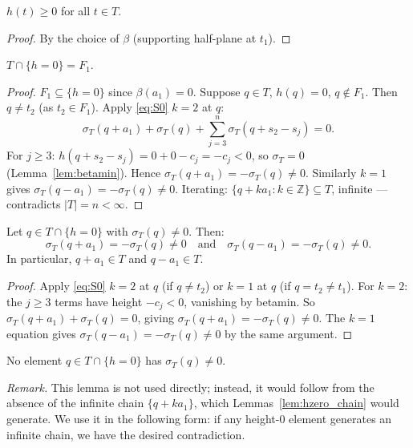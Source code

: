 \begin{lemma}[betamin]\label{lem:betamin}
$h(t) \geq 0$ for all $t \in T$.
\end{lemma}
\begin{proof}
By the choice of $\beta$ (supporting half-plane at $t_1$).
\end{proof}

\begin{lemma}[hzero]\label{lem:hzero}
$T \cap \{h = 0\} = F_1$.
\end{lemma}
\begin{proof}
$F_1 \subseteq \{h=0\}$ since $\beta(a_1)=0$.
Suppose $q \in T$, $h(q)=0$, $q \notin F_1$.  Then $q \neq t_2$ (as $t_2 \in F_1$).
Apply \eqref{eq:S0} $k=2$ at $q$:
\[
  \sigma_T(q+a_1) + \sigma_T(q) + \sum_{j=3}^n \sigma_T(q+s_2-s_j) = 0.
\]
For $j \geq 3$: $h(q+s_2-s_j) = 0 + 0 - c_j = -c_j < 0$, so $\sigma_T = 0$
(Lemma~\ref{lem:betamin}).  Hence $\sigma_T(q+a_1) = -\sigma_T(q) \neq 0$.
Similarly $k=1$ gives $\sigma_T(q-a_1) = -\sigma_T(q) \neq 0$.
Iterating: $\{q+ka_1 : k\in\mathbb{Z}\} \subseteq T$, infinite — contradicts $|T|=n<\infty$.
\end{proof}

\begin{lemma}\label{lem:hzero_chain}
Let $q \in T \cap \{h=0\}$ with $\sigma_T(q) \neq 0$.  Then:
\[
  \sigma_T(q + a_1) = -\sigma_T(q) \neq 0 \quad\text{and}\quad \sigma_T(q-a_1) = -\sigma_T(q) \neq 0.
\]
In particular, $q+a_1 \in T$ and $q-a_1 \in T$.
\end{lemma}
\begin{proof}
Apply \eqref{eq:S0} $k=2$ at $q$ (if $q \neq t_2$) or $k=1$ at $q$ (if $q=t_2\neq t_1$).
For $k=2$: the $j \geq 3$ terms have height $-c_j < 0$, vanishing by betamin.
So $\sigma_T(q+a_1)+\sigma_T(q)=0$, giving $\sigma_T(q+a_1)=-\sigma_T(q)\neq 0$.
The $k=1$ equation gives $\sigma_T(q-a_1)=-\sigma_T(q)\neq 0$ by the same argument.
\end{proof}

\begin{lemma}\label{lem:no_chain_0}
No element $q \in T \cap \{h=0\}$ has $\sigma_T(q) \neq 0$.
\end{lemma}

\emph{Remark.} This lemma is not used directly; instead, it would follow from the absence
of the infinite chain $\{q+ka_1\}$, which Lemmas~\ref{lem:hzero_chain} would generate.
We use it in the following form: if any height-0 element generates an infinite chain,
we have the desired contradiction.

